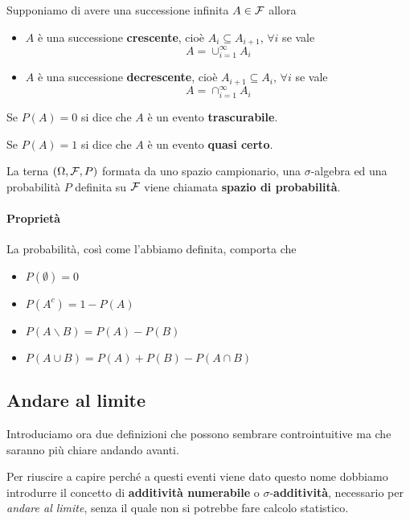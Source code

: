 \begin{proposition}
	Supponiamo di avere una successione infinita $A \in \mathcal{F}$	allora
	\begin{itemize}
		\item $A$ è una successione \textbf{crescente}, cioè $A_i \subseteq A_{i+1}$, $\forall i$
			se vale
			\[ A = \cup_{i=1}^\infty A_i \]
		\item $A$ è una successione \textbf{decrescente}, cioè $A_{i+1} \subseteq A_i$,
			$\forall i$ se vale 
			\[ A = \cap_{i=1}^\infty A_i \]
	\end{itemize}
\end{proposition}

\begin{definition}
	Se $P(A) = 0$ si dice che $A$ è un evento \textbf{trascurabile}.
\end{definition}

\begin{definition}
	Se $P(A) = 1$ si dice che $A$ è un evento \textbf{quasi certo}.
\end{definition}

\begin{definition}
	La terna $(\Omega, \mathcal{F}, P)$ formata da uno spazio campionario, una $\sigma$-algebra ed una
	probabilità $P$ definita su $\mathcal{F}$ viene chiamata \textbf{spazio di probabilità}.
\end{definition}

\paragraph{Proprietà} La probabilità, così come l'abbiamo definita, comporta che
\begin{itemize}
	\item $P(\emptyset) = 0$
	\item $P(A^c) = 1 - P(A)$
	\item $P(A \backslash B) = P(A) - P(B)$
	\item $P(A \cup B) = P(A) + P(B) - P(A \cap B)$
\end{itemize}

\subsection{Andare al limite}
Introduciamo ora due definizioni che possono sembrare controintuitive ma che saranno più chiare
andando avanti.



Per riuscire a capire perché a questi eventi viene dato questo nome dobbiamo introdurre il
concetto di \textbf{additività numerabile} o $\sigma$-\textbf{additività}, necessario per
\emph{andare al limite}, senza il quale non si potrebbe fare calcolo statistico.

